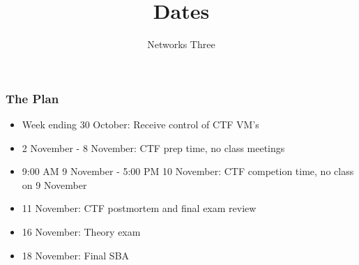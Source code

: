 \documentclass[10pt]{beamer}
\title{Dates}
\author[IN715]{Networks Three}
\institute[Otago Polytechnic]{
  Otago Polytechnic \\
  Dunedin, New Zealand \\
}
\date{}
\begin{document}
\begin{frame}
  \frametitle{The Plan}

 \begin{itemize}
  \item Week ending 30 October:  Receive control of CTF VM's
  \item 2 November - 8 November:  CTF prep time, no class meetings
  \item 9:00 AM 9 November - 5:00 PM 10 November: CTF competion time, no class on 9 November
  \item 11 November: CTF postmortem and final exam review
  \item 16 November: Theory exam
  \item 18 November: Final SBA
 \end{itemize}
\end{frame}
\end{document}
